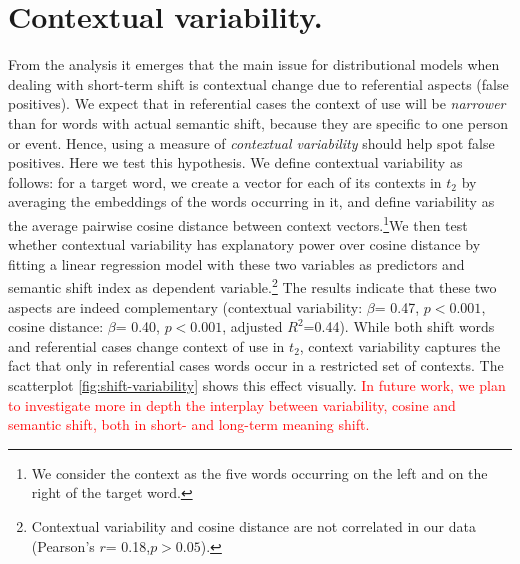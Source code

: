 \section{Contextual variability.}


From the analysis it emerges that the main issue for distributional models when dealing
with short-term shift is contextual change due to referential aspects (false positives).
We expect that in referential cases the context of use will be
\textit{narrower} than for words with actual semantic shift, because
they are specific to one person or event. Hence, using a measure of
\textit{contextual variability} should help spot false
positives.
Here we test this hypothesis. 
We define contextual variability as follows: for a target word, we create a vector for each of its contexts in $t_2$ by averaging the embeddings of the words  occurring in it, and define variability as the average pairwise cosine distance between context vectors.\footnote{We consider the context as the five words occurring on the left and on the right of the target word.}We then test whether contextual variability has explanatory power over cosine distance by fitting a linear regression model with these two variables as predictors and semantic shift index as dependent variable.\footnote{Contextual variability and cosine distance are not correlated in our data (Pearson's $r$= 0.18,$p> 0.05$). }
The results indicate that these two aspects are indeed complementary (contextual variability: $\beta$= 0.47, $p< 0.001$, cosine distance: $\beta$= 0.40, $p< 0.001$, adjusted $R^2$=0.44). While both shift words and referential cases change context of use in $t_2$, context variability captures the fact that only in referential cases words occur in a restricted set of contexts. The scatterplot \ref{fig:shift-variability} shows this effect visually. \textcolor{red}{In future work, we plan to investigate more in depth the interplay between variability, cosine and semantic shift, both in short- and long-term meaning shift.}

